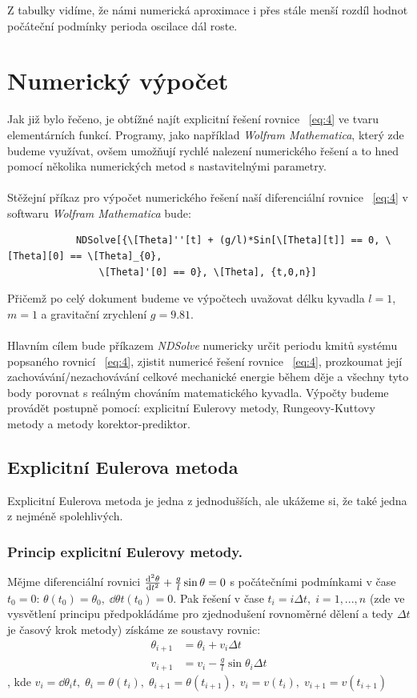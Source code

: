 \documentclass[reqno, a4paper]{amsart}
\begin{document}
	
	Z tabulky vidíme, že námi numerická aproximace i přes stále menší rozdíl hodnot počáteční podmínky perioda oscilace dál roste. 
		\section{Numerický výpočet}
		Jak již bylo řečeno, je obtížné najít explicitní řešení rovnice ~\eqref{eq:4} ve tvaru elementárních funkcí. Programy, jako například \textit{Wolfram Mathematica}, který zde budeme využívat, ovšem umožňují rychlé nalezení numerického řešení a to hned pomocí několika numerických metod s nastavitelnými parametry.\
		\\
		\\
		Stěžejní příkaz pro výpočet numerického řešení naší diferenciální rovnice ~\eqref{eq:4} v softwaru \textit{Wolfram Mathematica} bude:
		\begin{verbatim}
			NDSolve[{\[Theta]''[t] + (g/l)*Sin[\[Theta][t]] == 0, \[Theta][0] == \[Theta]_{0}, 
				\[Theta]'[0] == 0}, \[Theta], {t,0,n}]
		\end{verbatim}
		Přičemž po celý dokument budeme ve výpočtech uvažovat délku kyvadla $ l=1 $, $ m=1 $ a gravitační zrychlení $ g=9.81 $.
		\\
		\\
		Hlavním cílem bude příkazem \textit{NDSolve} numericky určit periodu kmitů systému popsaného rovnicí ~\eqref{eq:4}, zjistit numericé řešení rovnice ~\eqref{eq:4}, prozkoumat její zachovávání/nezachovávání celkové mechanické energie během děje a všechny tyto body porovnat s reálným chováním matematického kyvadla. Výpočty budeme provádět postupně pomocí: explicitní Eulerovy metody, Rungeovy-Kuttovy metody a metody korektor-prediktor.
		\subsection{Explicitní Eulerova metoda}
		Explicitní Eulerova metoda je jedna z jednodušších, ale ukážeme si, že také jedna z nejméně spolehlivých.
		\\
		\subsubsection{Princip explicitní Eulerovy metody.} Mějme diferenciální rovnici $\frac{\mathrm{d}^2 {\theta}}{\mathrm{d} {t}^2} + \frac{g}{l} \sin \theta = 0$ s počátečními podmínkami v čase $t_{0}=0$: $\theta(t_{0})=\theta_{0},\; \dd{\theta}{t}(t_{0})=0$. Pak řešení v čase $t_{i}=i\Delta t,\; i=1,...,n$ (zde ve vysvětlení principu předpokládáme pro zjednodušení rovnoměrné dělení a tedy $ \Delta t$ je časový krok metody) získáme ze soustavy rovnic: 
		\begin{align}
			\theta_{i+1}& =\theta_{i}+v_{i}\Delta t\\
			v_{i+1}& =v_{i}-\frac{g}{l}\sin\theta_{i}\Delta t
		\end{align}
		, kde $ v_{i}=\dd{\theta_{i}}{t},\; \theta_{i}=\theta(t_{i}),\;\theta_{i+1}=\theta(t_{i+1}),\;v_{i}=v(t_{i}),\;v_{i+1}=v(t_{i+1})$
		\\
\end{document}
